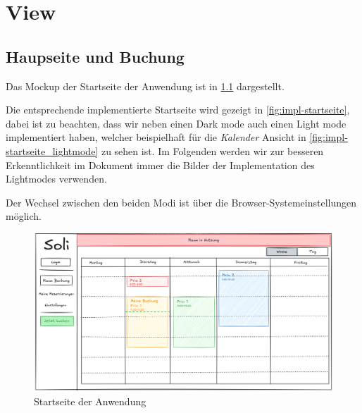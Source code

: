 
\chapter{View}
\label{chap:view}


\section{Haupseite und Buchung}

Das Mockup der Startseite der Anwendung ist in \ref{fig:startseite} dargestellt.

Die entsprechende implementierte Startseite wird gezeigt in \ref{fig:impl-startseite},
dabei ist zu beachten, dass wir neben einen Dark mode auch einen Light mode implementiert haben,
welcher beispielhaft für die \textit{Kalender} Ansicht in \ref{fig:impl-startseite_lightmode} zu sehen ist.
Im Folgenden werden wir zur besseren Erkenntlichkeit im Dokument immer die Bilder der Implementation des Lightmodes
verwenden.

Der Wechsel zwischen den beiden Modi ist über die Browser-Systemeinstellungen möglich.


\begin{figure}[ht]
    \centering
    \includegraphics[width=\textwidth]{figures/mockup/calendar}
    \caption{Startseite der Anwendung}
    \label{fig:startseite}
\end{figure}
\pagebreak

